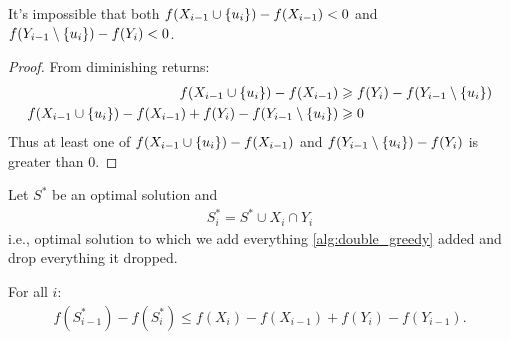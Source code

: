 \begin{prop}
	It's impossible that both $f(X_{i-1} \cup \qty{u_i})-f(X_{i-1}) <0$ and  $f(Y_{i-1} \setminus \qty{u_i}) - f(Y_i)<0$.
	\begin{proof}
		From diminishing returns:
		\begin{align}
		f(X_{i-1} \cup \qty{u_i})-f(X_{i-1}) &\geqslant f(Y_i) - f(Y_{i-1} \setminus \qty{u_i})  \\
		f(X_{i-1} \cup \qty{u_i})-f(X_{i-1}) + f(Y_i) - f(Y_{i-1} \setminus \qty{u_i}) &\geqslant 0
		\end{align}
		Thus at least one of  $f(X_{i-1} \cup \qty{u_i})-f(X_{i-1}) $ and  $f(Y_{i-1} \setminus \qty{u_i}) - f(Y_i)$ is greater than $0$.
	\end{proof}
\end{prop}


\begin{lemma}
	Let $S^*$ be an optimal solution and 
	\begin{align}
	S^*_i = S^* \cup X_i \cap Y_i
	\end{align}
	i.e., optimal solution to which we add everything \cref{alg:double_greedy} added and drop everything it dropped.
	
	For all $i$:
	\begin{align}
	f(S^*_{i-1}) - f(S^*_i) \leqslant f(X_i) - f(X_{i-1})+f(Y_i) - f(Y_{i-1}).
	\end{align}
\end{lemma}

